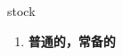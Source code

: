 
\begin{frame}
{\huge stock}
\begin{center}
\begin{enumerate}\Large
  \item \textbf{普通的，常备的}
\end{enumerate}
\end{center}
\end{frame}
